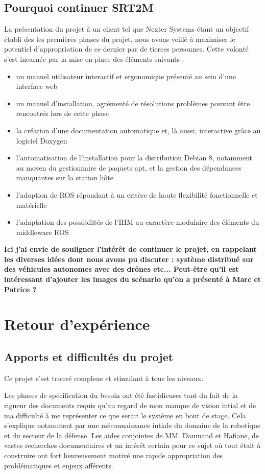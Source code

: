   \subsection{Pourquoi continuer SRT2M}
  
  La présentation du projet à un client tel que Nexter Systems étant un objectif établi des les premières phases du projet, nous avons veillé à maximiser le potentiel d'appropriation de ce dernier par de tierces personnes.
  Cette volonté s'est incarnée par la mise en place des éléments suivants : 
  
  \begin{itemize}
   \item un manuel utilisateur interactif et ergonomique présenté au sein d'une interface web
   \item un manuel d'installation, agrémenté de résolutions problèmes pouvant être rencontrés lors de cette phase
   \item la création d'une documentation automatique et, là aussi, interactive grâce au logiciel Doxygen
   \item l'automatisation de l'installation pour la distribution Debian 8, notamment au moyen du gestionnaire de paquets apt, et la gestion des dépendances manquantes sur la station hôte
   \item l'adoption de ROS répondant à un critère de haute flexibilité fonctionnelle et matérielle
   \item l'adaptation des possibilités de l'IHM au caractère modulaire des éléments du middleware ROS 
  \end{itemize}
  
  \textbf{Ici j'ai envie de souligner l'intérêt de continuer le projet, en rappelant les diverses idées dont nous avons pu discuter : système distribué sur des véhicules autonomes avec des drônes etc... 
  Peut-être qu'il est intéressant d'ajouter les images du scénario qu'on a présenté à Marc et Patrice ? }
  
\section{Retour d'expérience}
  \subsection{Apports et difficultés du projet}
  
  Ce projet s'est trouvé complexe et stimulant à tous les niveaux. 
  
  Les phases de spécification du besoin ont été fastidieuses tant du fait de la rigueur des documents requis qu'au regard de mon manque de vision intial et de ma difficulté à me représenter ce que serait le système en bout de stage. 
  Cela s'explique notamment par une méconnaissance intiale du domaine de la robotique et du secteur de la défense.
  Les aides conjointes de MM. Daumand et Hafiane, de vastes recherches documentaires et un intérêt certain pour ce sujet où tout était à construire ont fort heureusement motivé une rapide appropriation des problématiques et enjeux afférents. 
  
